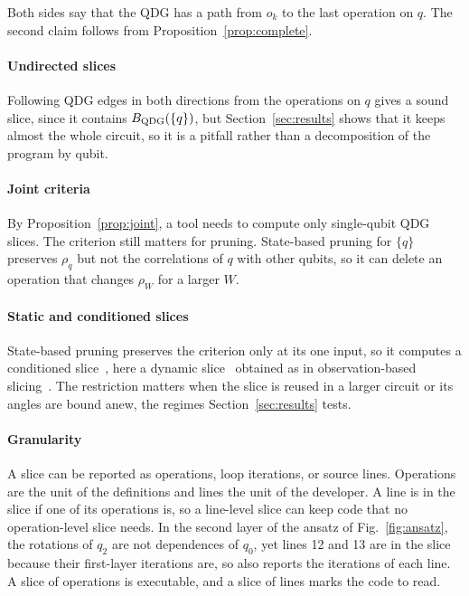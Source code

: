 \begin{IEEEproof}
Both sides say that the QDG has a path from $o_k$ to the last operation on $q$. The second claim follows
from Proposition~\ref{prop:complete}.
\end{IEEEproof}

\paragraph*{Undirected slices}
Following QDG edges in both directions from the operations on $q$ gives a sound slice, since it contains
$B_{\mathrm{QDG}}(\{q\})$, but Section~\ref{sec:results} shows that it keeps almost the whole circuit, so it is a
pitfall rather than a decomposition of the program by qubit.

\paragraph*{Joint criteria}
By Proposition~\ref{prop:joint}, a tool needs to compute only single-qubit QDG slices. The criterion
still matters for pruning. State-based pruning for $\{q\}$ preserves $\rho_q$ but not the correlations
of $q$ with other qubits, so it can delete an operation that changes $\rho_W$ for a larger $W$.

\paragraph*{Static and conditioned slices}
State-based pruning preserves the criterion only at its one input, so it computes a conditioned
slice~\cite{canfora1998conditioned}, here a dynamic slice~\cite{korel1988dynamic} obtained as in
observation-based slicing~\cite{binkley2014orbs}. The restriction matters when the slice is reused in a
larger circuit or its angles are bound anew, the regimes Section~\ref{sec:results} tests.

\paragraph*{Granularity}
A slice can be reported as operations, loop iterations, or source lines. Operations are the unit of the
definitions and lines the unit of the developer. A line is in the slice if one of its operations is, so a
line-level slice can keep code that no operation-level slice needs. In the second layer of the ansatz of
Fig.~\ref{fig:ansatz}, the rotations of $q_2$ are not dependences of $q_0$, yet lines 12 and 13 are in
the slice because their first-layer iterations are, so \tool{} also reports the iterations of each line.
A slice of operations is executable, and a slice of lines marks the code to read.

